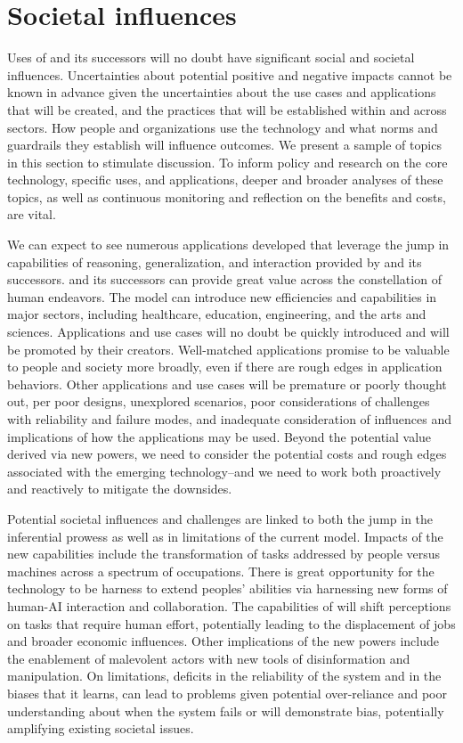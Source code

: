 \section{Societal influences}
\label{sec:societal}


Uses of {\DV} and its successors will no doubt have significant social and societal influences. Uncertainties about potential positive and negative impacts cannot be known in advance given the uncertainties about the use cases and applications that will be created, and the practices that will be established within and across sectors. How people and organizations use the technology and what norms and guardrails they establish will influence outcomes. We present a sample of topics in this section to stimulate discussion. To inform policy and research on the core technology, specific uses, and applications, deeper and broader analyses of these topics, as well as continuous monitoring and reflection on the benefits and costs, are vital.

We can expect to see numerous applications developed that leverage the jump in capabilities of reasoning, generalization, and interaction provided by {\DV} and its successors. {\DV} and its successors can provide great value across the constellation of human endeavors. The model can introduce new efficiencies and capabilities in major sectors, including healthcare, education, engineering, and the arts and sciences. Applications and use cases will no doubt be quickly introduced and will be promoted by their creators. Well-matched applications promise to be valuable to people and society more broadly, even if there are rough edges in application behaviors. Other applications and use cases will be premature or poorly thought out, per poor designs, unexplored scenarios, poor considerations of challenges with reliability and failure modes, and inadequate consideration of influences and implications of how the applications may be used. Beyond the potential value derived via new powers, we need to consider the potential costs and rough edges associated with the emerging technology--and we need to work both proactively and reactively to mitigate the downsides.
 
Potential societal influences and challenges are linked to both the jump in the inferential prowess as well as in limitations of the current model.  Impacts of the new capabilities include the transformation of  tasks addressed by people versus machines across a spectrum of occupations. There is great opportunity for the technology to be harness to extend peoples' abilities via harnessing new forms of human-AI interaction and collaboration. The capabilities of {\DV} will shift perceptions on tasks that require human effort, potentially leading to the displacement of jobs and broader economic influences. Other implications of the new powers include the enablement of malevolent actors with new tools of disinformation and manipulation.  On limitations, deficits in the reliability of the system and in the biases that it learns, can lead to problems given potential over-reliance and poor understanding about when the system fails or will demonstrate bias, potentially amplifying existing societal issues.

